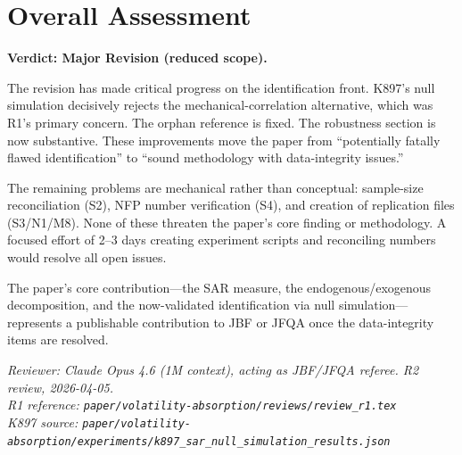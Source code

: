 \documentclass[12pt,a4paper]{article}
\begin{document}
\section*{Overall Assessment}

\textbf{Verdict: Major Revision (reduced scope).}

The revision has made critical progress on the identification front. K897's null simulation decisively rejects the mechanical-correlation alternative, which was R1's primary concern. The orphan reference is fixed. The robustness section is now substantive. These improvements move the paper from ``potentially fatally flawed identification'' to ``sound methodology with data-integrity issues.''

The remaining problems are mechanical rather than conceptual: sample-size reconciliation (S2), NFP number verification (S4), and creation of replication files (S3/N1/M8). None of these threaten the paper's core finding or methodology. A focused effort of 2--3 days creating experiment scripts and reconciling numbers would resolve all open issues.

The paper's core contribution---the SAR measure, the endogenous/exogenous decomposition, and the now-validated identification via null simulation---represents a publishable contribution to JBF or JFQA once the data-integrity items are resolved.

\bigskip

\noindent\textit{Reviewer: Claude Opus 4.6 (1M context), acting as JBF/JFQA referee. R2 review, 2026-04-05.}\\
\noindent\textit{R1 reference: \texttt{paper/volatility-absorption/reviews/review\_r1.tex}}\\
\noindent\textit{K897 source: \texttt{paper/volatility-absorption/experiments/k897\_sar\_null\_simulation\_results.json}}
\end{document}
